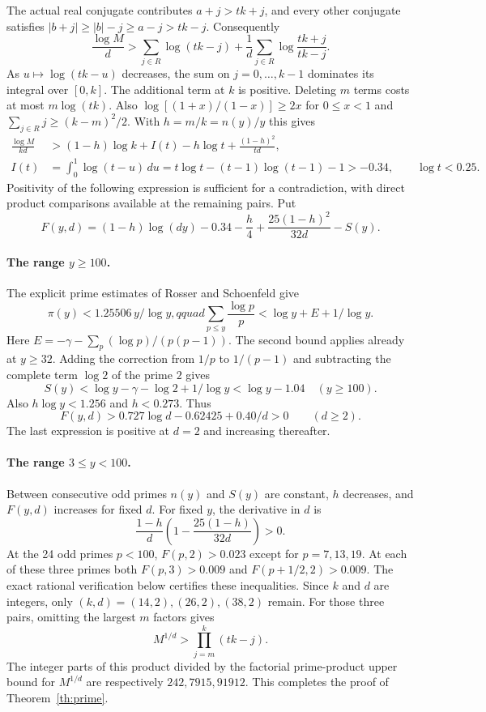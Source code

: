\documentclass[11pt,a4paper]{article}
\theoremstyle{definition}\newtheorem{definition}[theorem]{Definition}\newtheorem{example}[theorem]{Example}
\theoremstyle{remark}\newtheorem{remark}[theorem]{Remark}
\begin{document}
The actual real conjugate contributes $a+j>tk+j$, and every other conjugate satisfies $|b+j|\ge|b|-j\ge a-j>tk-j$. Consequently
\[
 \frac{\log M}{d}>
 \sum_{j\in R}\log(tk-j)+\frac1d\sum_{j\in R}\log\frac{tk+j}{tk-j}.
\]
As $u\mapsto\log(tk-u)$ decreases, the sum on $j=0,\ldots,k-1$ dominates its integral over $[0,k]$. The additional term at $k$ is positive. Deleting $m$ terms costs at most $m\log(tk)$. Also $\log[(1+x)/(1-x)]\ge2x$ for $0\le x<1$ and $\sum_{j\in R}j\ge(k-m)^2/2$. With $h=m/k=n(y)/y$ this gives
\begin{align*}
 \frac{\log M}{kd}
 &>(1-h)\log k+I(t)-h\log t+\frac{(1-h)^2}{td},\\
 I(t)&=\int_0^1\log(t-u)\,du
 =t\log t-(t-1)\log(t-1)-1>-0.34,\qquad \log t<0.25 .
\end{align*}
Positivity of the following expression is sufficient for a contradiction, with direct product comparisons available at the remaining pairs. Put
\[
 F(y,d)=(1-h)\log(dy)-0.34-\frac h4
       +\frac{25(1-h)^2}{32d}-S(y).
\]

\paragraph{The range $y\ge100$.}
The explicit prime estimates of Rosser and Schoenfeld \cite[(3.6), (3.23)]{RS} give
\[
 \pi(y)<1.25506\,y/\log y,qquad
 \sum_{p\le y}\frac{\log p}{p}<\log y+E+1/\log y .
\]
Here $E=-\gamma-\sum_p(\log p)/(p(p-1))$. The second bound applies already at $y\ge32$. Adding the correction from $1/p$ to $1/(p-1)$ and subtracting the complete term $\log2$ of the prime $2$ gives
\[
 S(y)<\log y-\gamma-\log2+1/\log y<\log y-1.04
 \quad (y\ge100).
\]
Also $h\log y<1.256$ and $h<0.273$. Thus
\[
 F(y,d)>0.727\log d-0.62425+0.40/d>0
 \qquad(d\ge2).
\]
The last expression is positive at $d=2$ and increasing thereafter.

\paragraph{The range $3\le y<100$.}
Between consecutive odd primes $n(y)$ and $S(y)$ are constant, $h$ decreases, and $F(y,d)$ increases for fixed $d$. For fixed $y$, the derivative in $d$ is
\[
 \frac{1-h}{d}\left(1-\frac{25(1-h)}{32d}\right)>0.
\]
At the 24 odd primes $p<100$, $F(p,2)>0.023$ except for $p=7,13,19$. At each of these three primes both $F(p,3)>0.009$ and $F(p+1/2,2)>0.009$. The exact rational verification below certifies these inequalities. Since $k$ and $d$ are integers, only $(k,d)=(14,2),(26,2),(38,2)$ remain. For those three pairs, omitting the largest $m$ factors gives
\[
 M^{1/d}>\prod_{j=m}^k(tk-j).
\]
The integer parts of this product divided by the factorial prime-product upper bound for $M^{1/d}$ are respectively $242,7915,91912$. This completes the proof of Theorem~\ref{th:prime}.
\end{document}

